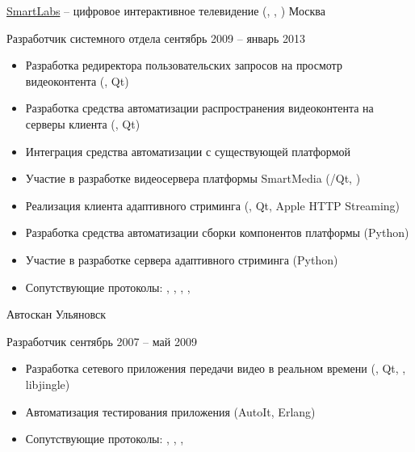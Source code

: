 \documentclass[unicode, 10pt, a4paper, oneside, fleqn]{article}
\begin{document}

\job  %
    {\href{http://www.smartlabs.tv}{SmartLabs} -- цифровое
     интерактивное телевидение (, , )}
    {Москва}
    {
        \position  %
            {Разработчик системного отдела}
            {сентябрь 2009 -- январь 2013}
            {
                \begin{itemize}
                    \item{Разработка редиректора пользовательских запросов на
                          просмотр видеоконтента (\CPP, Qt)}
                    \item{Разработка средства автоматизации распространения
                          видеоконтента на серверы клиента (\CPP, Qt)}
                    \item{Интеграция средства автоматизации с существующей платформой}
                    \item{Участие в разработке видеосервера платформы SmartMedia
                          (\CPP/Qt, )}
                    \item{Реализация клиента адаптивного стриминга (\CPP, Qt, Apple HTTP Streaming)}
                    \item{Разработка средства автоматизации сборки компонентов платформы
                          (Python)}
                    \item{Участие в разработке сервера адаптивного стриминга (Python)}
                    \item{Сопутствующие протоколы: , , ,
                          , }
                \end{itemize}
            }
    }


\job
    {Автоскан}
    {Ульяновск}
    {
        \position
            {Разработчик}
            {сентябрь 2007 -- май 2009}
            {
                \begin{itemize}
                    \item{Разработка сетевого приложения передачи видео в реальном
                          времени (\CPP, Qt, , libjingle)}
                    \item{Автоматизация тестирования приложения (AutoIt, Erlang)}
                    \item{Сопутствующие протоколы: , , ,
                          }
                \end{itemize}
            }
    }
\end{document}
